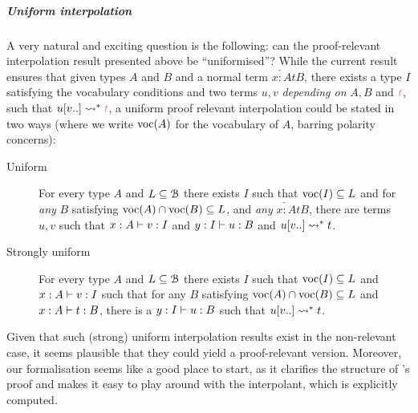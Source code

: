 \documentclass[a4paper,UKenglish,cleveref, autoref, thm-restate]{lipics-v2021}
\begin{document}
\subparagraph*{Uniform interpolation}
A very natural and exciting question is the following: can the proof-relevant interpolation result presented above be ``uniformised''? 
While the current result ensures that given types $A$ and $B$ and a normal term
$\check{x: A}{t}{B}$, there exists a type $I$ satisfying the vocabulary conditions and two terms $u,v$ \emph{depending on} $A,B$ and $\ccol{t}$, such that $\red{\subs{u}{v..}}{\ccol{t}}$, a uniform proof relevant interpolation could be stated in two ways
(where we write \(\operatorname{voc}(A)\) for the vocabulary of \(A\), barring polarity
concerns):
\begin{description}
\item[Uniform] For every type $A$ and $L \subseteq \mathcal{B}$ there exists $I$ such that $\operatorname{voc}(I)\subseteq L$ and for \emph{any} $B$ satisfying $\operatorname{voc}(A) \cap \operatorname{voc}(B) \subseteq L$,
and \emph{any} $\check{x:A}{t}{B}$, there are terms $u,v$ such that
  $\typing{x: A}{v}[I]$ and $\typing{y: I}{u}[B]$ and $ \red{\subs{u}{v..}}{t}$.
\item[Strongly uniform] For every type $A$ and $L \subseteq \mathcal{B}$ there exists $I$ such that
  $\operatorname{voc}(I)\subseteq L$ and $\typing{x: A}{v}[I]$ such that for any $B$ satisfying $\operatorname{voc}(A)\cap \operatorname{voc}(B) \subseteq L$ and $\typing{x:A}{t}[B]$, there is a $\typing{y: I}{u}[B]$
    such that $ \red{\subs{u}{v..}}{t}$.
\end{description}
Given that such (strong) uniform interpolation results exist in the non-relevant
case, it seems plausible that they could yield a proof-relevant version. Moreover,
our formalisation seems like a good place to start, as it clarifies the structure
of \Cubric's proof and makes it easy to play around with the interpolant, which
is explicitly computed.
\end{document}
